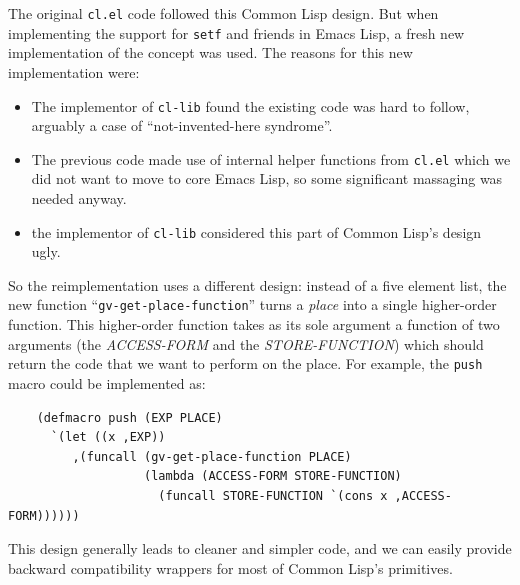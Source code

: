 \documentclass[format=acmsmall, review]{acmart}
\newcommand \Elisp {Emacs Lisp}
\begin{document}
The original \texttt{cl.el} code followed this Common Lisp design.  But when
implementing the support for \texttt{setf} and friends in \Elisp{}, a fresh
new implementation of the concept was used.  The reasons for this new
implementation were:
\begin{itemize}
\item The implementor of \texttt{cl-lib} %
  found the existing code was hard
  to follow, arguably a case of ``not-invented-here syndrome''.
\item The previous code made use of internal helper functions from
  \texttt{cl.el} which we did not want to move to core \Elisp, so some
  significant massaging was needed anyway.
\item the implementor of \texttt{cl-lib} considered this part of Common Lisp's
  design ugly.
\end{itemize}
So the reimplementation uses a different design: instead of a five element
list, the new function ``\texttt{gv-get-place-function}'' turns
a \emph{place}  into a single higher-order function.
This higher-order function takes as its sole argument a function
of two arguments (the \textsl{ACCESS-FORM} and the \textsl{STORE-FUNCTION})
which should return the code that we want to perform on the place.
For example, the \texttt{push} macro could be implemented as:
\begin{verbatim}
    (defmacro push (EXP PLACE)
      `(let ((x ,EXP))
         ,(funcall (gv-get-place-function PLACE)
                   (lambda (ACCESS-FORM STORE-FUNCTION)
                     (funcall STORE-FUNCTION `(cons x ,ACCESS-FORM))))))
\end{verbatim}
This design generally leads to cleaner and simpler code, and we can easily
provide backward compatibility wrappers for most of Common Lisp's
primitives.
\end{document}
